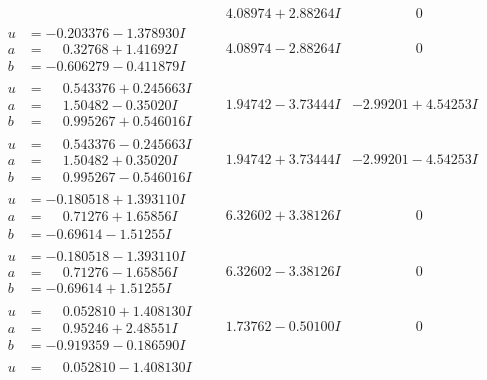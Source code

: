 \documentclass[1p]{elsarticle_modified}
\theoremstyle{definition}
\begin{document}
$$\begin{array}{c|c|c}
 & \phantom{-}4.08974 + 2.88264 I & \phantom{-0.000000 } 0 \\ \hline\begin{aligned}
u &= -0.203376 - 1.378930 I \\
a &= \phantom{-}0.32768 + 1.41692 I \\
b &= -0.606279 - 0.411879 I\end{aligned}
 & \phantom{-}4.08974 - 2.88264 I & \phantom{-0.000000 } 0 \\ \hline\begin{aligned}
u &= \phantom{-}0.543376 + 0.245663 I \\
a &= \phantom{-}1.50482 - 0.35020 I \\
b &= \phantom{-}0.995267 + 0.546016 I\end{aligned}
 & \phantom{-}1.94742 - 3.73444 I & -2.99201 + 4.54253 I \\ \hline\begin{aligned}
u &= \phantom{-}0.543376 - 0.245663 I \\
a &= \phantom{-}1.50482 + 0.35020 I \\
b &= \phantom{-}0.995267 - 0.546016 I\end{aligned}
 & \phantom{-}1.94742 + 3.73444 I & -2.99201 - 4.54253 I \\ \hline\begin{aligned}
u &= -0.180518 + 1.393110 I \\
a &= \phantom{-}0.71276 + 1.65856 I \\
b &= -0.69614 - 1.51255 I\end{aligned}
 & \phantom{-}6.32602 + 3.38126 I & \phantom{-0.000000 } 0 \\ \hline\begin{aligned}
u &= -0.180518 - 1.393110 I \\
a &= \phantom{-}0.71276 - 1.65856 I \\
b &= -0.69614 + 1.51255 I\end{aligned}
 & \phantom{-}6.32602 - 3.38126 I & \phantom{-0.000000 } 0 \\ \hline\begin{aligned}
u &= \phantom{-}0.052810 + 1.408130 I \\
a &= \phantom{-}0.95246 + 2.48551 I \\
b &= -0.919359 - 0.186590 I\end{aligned}
 & \phantom{-}1.73762 - 0.50100 I & \phantom{-0.000000 } 0 \\ \hline\begin{aligned}
u &= \phantom{-}0.052810 - 1.408130 I \\

\end{aligned}
\end{array}$$
\end{document}
